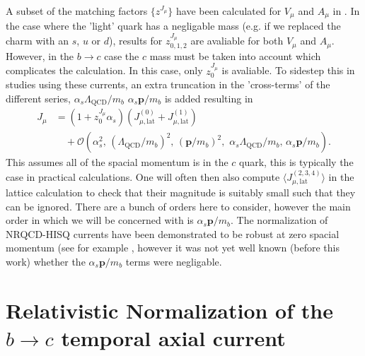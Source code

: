 A subset of the matching factors $\{z^{J_{\mu}}\}$ have been calculated for $V_{\mu}$ and $A_{\mu}$ in \cite{Monahan:2012dq}. In the case where the 'light' quark has a negligable mass (e.g. if we replaced the charm with an $s$, $u$ or $d$), results for $z^{J_{\mu}}_{0,1,2}$ are avaliable for both $V_{\mu}$ and $A_{\mu}$. However, in the $b\to c$ case the $c$ mass must be taken into account which complicates the calculation. In this case, only $z^{J_{\mu}}_{0}$ is avaliable. To sidestep this in studies using these currents, an extra truncation in the 'cross-terms' of the different series, $\alpha_s \Lambda_{\text{QCD}}/m_b$ $\alpha_s {\textbf{p}}/m_b$ is added resulting in
\begin{align}
  \label{eq:nrqcd-hisq-current-truncate}
  J_{\mu} &= ( 1 + z^{J_{\mu}}_0 \alpha_s )( J_{\mu,\text{lat}}^{(0)} + J_{\mu,\text{lat}}^{(1)} ) \\ \nonumber &\quad + \mathcal{O}(\alpha_s^2,\, (\Lambda_{\text{QCD}}/m_b)^2,\, ({\textbf{p}}/m_b)^2,\,\, \alpha_s \Lambda_{\text{QCD}} / m_b, \, \alpha_s {\textbf{p}}/m_b ).
\end{align}
This assumes all of the spacial momentum is in the $c$ quark, this is typically the case in practical calculations. One will often then also compute $\langle J_{\mu,\text{lat}}^{(2,3,4)}\rangle$ in the lattice calculation to check that their magnitude is suitably small such that they can be ignored. There are a bunch of orders here to consider, however the main order in which we will be concerned with is $\alpha_s{\textbf{p}}/m_b$. The normalization of NRQCD-HISQ currents have been demonstrated to be robust at zero spacial momentum (see for example \cite{Hughes:2017spc}, however it was not yet well known (before this work) whether the $\alpha_s{\textbf{p}}/m_b$ terms were negligable.

\section{Relativistic Normalization of the $b\to c$ temporal axial current}
\label{sec:relativistic}

